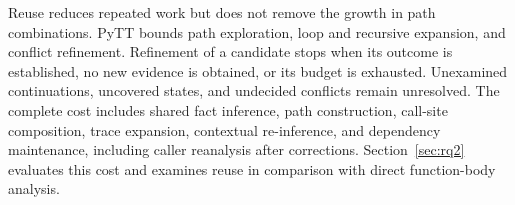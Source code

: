 Reuse reduces repeated work but does not remove the growth in path
combinations. PyTT bounds path exploration, loop and recursive expansion,
and conflict refinement. Refinement of a candidate stops when its
outcome is established, no new evidence is obtained, or its budget is
exhausted. Unexamined continuations, uncovered states, and undecided
conflicts remain unresolved. The complete cost includes shared fact
inference, path construction, call-site composition, trace expansion,
contextual re-inference, and dependency maintenance, including caller
reanalysis after corrections. Section~\ref{sec:rq2} evaluates this cost
and examines reuse in comparison with direct function-body analysis.
